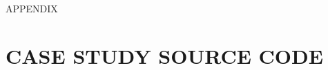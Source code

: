 \documentclass[SDSUThesis.tex]{subfiles}
\begin{document}
\newpage

\appendix
\label{appendix}
\begin{center}
APPENDIX\\
\end{center}




\section{CASE STUDY SOURCE CODE} 
\label{app:case}

\linespread{1.0}
\end{document}
